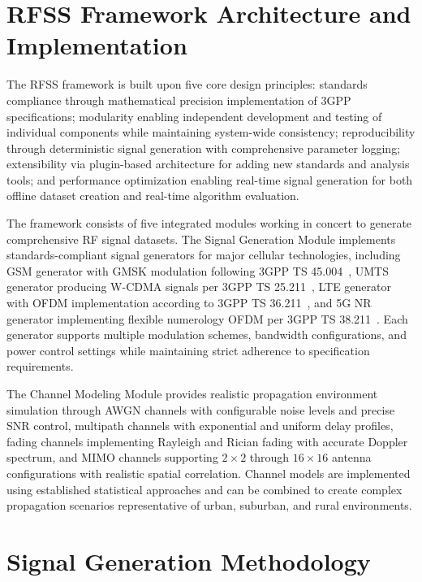 \documentclass[twocolumn,10pt]{article}
\begin{document}
\section{RFSS Framework Architecture and Implementation}

The RFSS framework is built upon five core design principles: standards compliance through mathematical precision implementation of 3GPP specifications; modularity enabling independent development and testing of individual components while maintaining system-wide consistency; reproducibility through deterministic signal generation with comprehensive parameter logging; extensibility via plugin-based architecture for adding new standards and analysis tools; and performance optimization enabling real-time signal generation for both offline dataset creation and real-time algorithm evaluation.

The framework consists of five integrated modules working in concert to generate comprehensive RF signal datasets. The Signal Generation Module implements standards-compliant signal generators for major cellular technologies, including GSM generator with GMSK modulation following 3GPP TS 45.004~\cite{3gpp2018ts45004}, UMTS generator producing W-CDMA signals per 3GPP TS 25.211~\cite{3gpp2018ts25211}, LTE generator with OFDM implementation according to 3GPP TS 36.211~\cite{3gpp2018ts36211}, and 5G NR generator implementing flexible numerology OFDM per 3GPP TS 38.211~\cite{3gpp2020ts38211}. Each generator supports multiple modulation schemes, bandwidth configurations, and power control settings while maintaining strict adherence to specification requirements.

The Channel Modeling Module provides realistic propagation environment simulation through AWGN channels with configurable noise levels and precise SNR control, multipath channels with exponential and uniform delay profiles, fading channels implementing Rayleigh and Rician fading with accurate Doppler spectrum, and MIMO channels supporting $2 \times 2$ through $16 \times 16$ antenna configurations with realistic spatial correlation. Channel models are implemented using established statistical approaches and can be combined to create complex propagation scenarios representative of urban, suburban, and rural environments.

\section{Signal Generation Methodology}
\end{document}
